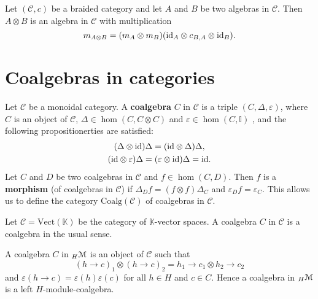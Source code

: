 
\begin{example}
Let $(\mathcal{C},c)$ be a braided category and let $A$ and $B$ be two algebras
in $\mathcal{C}$. Then $A\otimes B$ is an algebra in $\mathcal{C}$ with
multiplication 
\[
m_{A\otimes B}=(m_A\otimes m_B)(\mathrm{id}_A\otimes c_{B,A}\otimes \mathrm{id}_B).
\]
\end{example}

\section{Coalgebras in categories}

\begin{definition}
Let $\mathcal{C}$ be a monoidal category. A \textbf{coalgebra}
$C$ in $\mathcal{C}$ is a triple $(C,\Delta,\varepsilon)$, where
$C$ is an object of $\mathcal{C}$, $\Delta\in\hom(C,C\otimes C)$
and $\varepsilon\in\hom(C,\mathbb{I})$ , and the following propositionerties
are satisfied: 
\begin{gather*}
(\Delta\otimes\mathrm{id})\Delta=(\mathrm{id}\otimes\Delta)\Delta,\\
(\mathrm{id}\otimes\varepsilon)\Delta=(\varepsilon\otimes\mathrm{id})\Delta=\mathrm{id}.
\end{gather*}
Let $C$ and $D$ be two coalgebras in $\mathcal{C}$ and $f\in\hom(C,D)$.
Then $f$ is a \textbf{morphism} (of coalgebras in $\mathcal{C}$)
if $\Delta_{D}f=(f\otimes f)\Delta_{C}$ and $\varepsilon_{D}f=\varepsilon_{C}$.
This allows us to define the category $\mathrm{Coalg}(\mathcal{C})$
of coalgebras in $\mathcal{C}$.
\end{definition}

\begin{example}
Let $\mathcal{C}=\mathrm{Vect}(\mathbb{K})$ be the category of $\mathbb{K}$-vector
spaces. A coalgebra $C$ in $\mathcal{C}$ is a coalgebra in the usual sense.
\end{example}

\begin{example}
A coalgebra $C$ in ${}_{H}\mathcal{M}$ is an object of $\mathcal{C}$ such that 
\[
(h\to c)_{1}\otimes(h\to c)_{2}=h_{1}\to c_{1}\otimes h_{2}\to c_{2}
\]
and $\varepsilon(h\to c)=\varepsilon(h)\varepsilon(c)$ for all $h\in H$ and
$c\in C$. Hence a coalgebra in ${}_{H}\mathcal{M}$ is a left $H$-module-coalgebra.
\end{example}

